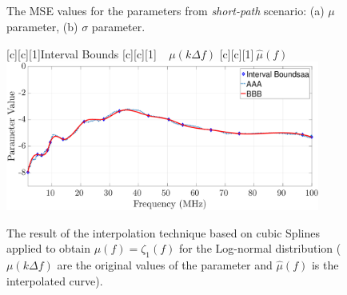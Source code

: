 \begin{figure}[h!]
	\centering
	\\~\\
	\\~\\
	\caption{The MSE values for the parameters from \textit{short-path} scenario: (a) $\mu$ parameter, (b) $\sigma$ parameter.}
	\label{fig:boundsSW}
\end{figure}

\begin{figure}[h]
	\centering
	[c][1]{Interval Bounds}
	[c][1]{$~~~~~\mu(k \Delta f)$}
	[c][1]{$~\hat{\mu}(f)$}
	\includegraphics[width=0.92\textwidth]{images/Alfa_fitsW.eps}
	\caption{The result of the interpolation technique based on cubic Splines applied to obtain $\mu(f)=\zeta_1(f)$ for the Log-normal distribution (${\mu}(k \Delta f)$ are the original values of the parameter and $\hat{\mu}(f)$ is the interpolated curve).}
	\label{Fit_alfasW}
\end{figure}

